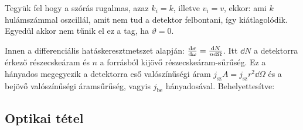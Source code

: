    Tegyük fel hogy a szórás rugalmas, azaz $k_i=k$, illetve $v_i=v$, ekkor:
   ami $k$ hulámszámmal oszcillál, amit nem tud a detektor felbontani, így kiátlagolódik. Egyedül akkor nem tűnik el ez a tag, ha $\vartheta=0$.
   
   Innen a differenciális hatáskeresztmetszet  alapján: $\frac{\mathrm{d} \sigma}{\mathrm{d} \omega}=\frac{\mathrm{d} N}{n\mathrm{d}\Omega}$. Itt $\dd N$ a detektorra érkező részecskeáram és $n$ a forrásból kijövő részecskeáram-sűrűség. Ez a hányados megegyezik a detektorra eső valószínűségi áram $j_\text{sz}A=j_\text{sz}r^2\dd\Omega$ és a bejövő valószínűségi áramsűrűség, vagyis $j_\text{be}$ hányadosával. Behelyettesítve:
   
  \subsection{Optikai tétel}
   
